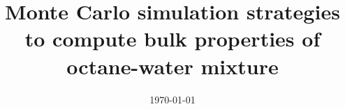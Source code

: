 \documentclass[twoside]{article}
\title{\vspace{-15mm}\fontsize{24pt}{10pt}\selectfont\textbf{Monte Carlo simulation strategies to compute bulk properties of octane-water mixture}} %
\date{\today}
\begin{document}
\maketitle %



\begin{abstract}



\end{abstract}

\end{document}

